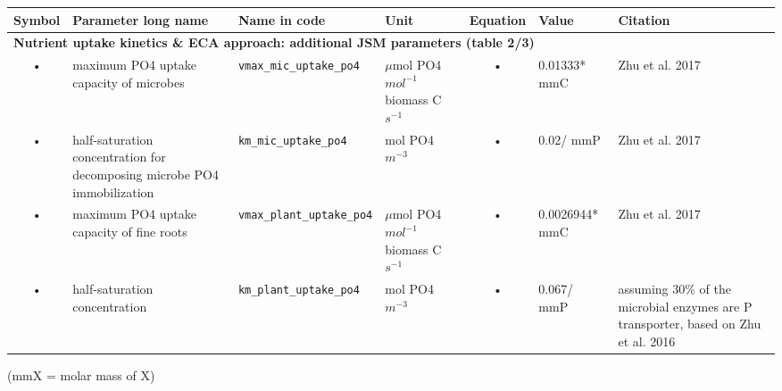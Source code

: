 \begin{table}
\begin{tabularx}{\linewidth}{|c|X|l|l|c|l|X|} %
\hline 
Symbol & Parameter long name & Name in code & Unit & Equation & Value & Citation \\ 
\hline 

\multicolumn{6}{l}{\bf Nutrient uptake kinetics \& ECA approach: additional JSM parameters (table 2/3)}\\
\hline
• & maximum PO4 uptake capacity of microbes & \texttt{vmax\_mic\_uptake\_po4} & $\mu$mol PO4 $mol^{-1}$ biomass C $s^{-1}$ & • & 0.01333* mmC & Zhu et al. 2017 \\
• & half-saturation concentration for decomposing microbe PO4 immobilization & \texttt{km\_mic\_uptake\_po4} & mol PO4 $m^{-3}$ & • & 0.02/ mmP & Zhu et al. 2017 \\
• & maximum PO4 uptake capacity of fine roots & \texttt{vmax\_plant\_uptake\_po4} & $\mu$mol PO4 $mol^{-1}$ biomass C $s^{-1}$ & • & 0.0026944* mmC & Zhu et al. 2017 \\
• & half-saturation concentration & \texttt{km\_plant\_uptake\_po4} & mol PO4 $m^{-3}$ & • & 0.067/ mmP & assuming 30\% of the microbial enzymes are P transporter, based on Zhu et al. 2016 \\
\hline 
\end{tabularx}
(mmX = molar mass of X)
\end{table}



